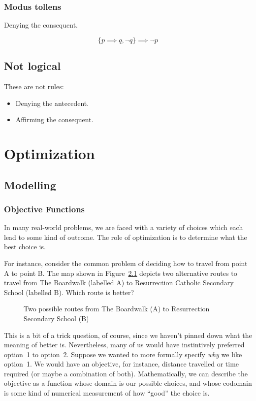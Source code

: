 \documentclass[a4paper,10pt]{report}
\begin{document}
\subsection{Modus tollens}

Denying the consequent.

\begin{equation*}
 \{p \implies q, \lnot q\} \implies \lnot p
\end{equation*}

\section{Not logical}
These are not rules:

\begin{itemize}
 \item Denying the antecedent.
 \item Affirming the consequent.
\end{itemize}

\chapter{Optimization}

\section{Modelling}

\subsection{Objective Functions}

In many real-world problems, we are faced with a variety of choices which each lead to some
kind of outcome. The role of optimization is to determine what the best choice is.

For instance, consider the common problem of deciding how to travel from point A  to point
B. The map shown in Figure~\ref{opt:pathfinding} depicts two alternative routes to travel
from The Boardwalk (labelled A) to Resurrection Catholic Secondary School (labelled B).
Which route is better?

\begin{figure}
  \mapBoardwalkRcss

  \caption{Two possible routes from The Boardwalk (A) to Resurrection Secondary School (B)}
  \label{opt:pathfinding}
\end{figure}

This is a bit of a trick question, of course, since we haven't pinned down what the meaning
of better is. Nevertheless, many of us would have instintively preferred option~1 to
option~2. Suppose we wanted to more formally specify \emph{why} we like option~1. We would
have an \gls{objective}, for instance, distance travelled or time required (or maybe a
combination of both). Mathematically, we can describe the objective as a function whose
domain is our possible choices, and whose codomain is some kind of numerical measurement of
how ``good'' the choice is.
\end{document}
